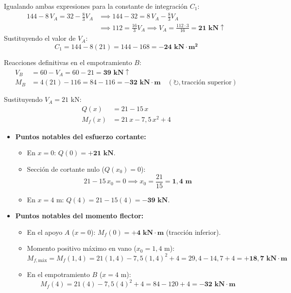 Igualando ambas expresiones para la constante de integración $C_1$:
\begin{align}
    144 - 8\,V_A = 32 - \frac{8}{3}V_A & \implies 144 - 32 = 8\,V_A - \frac{8}{3}V_A \nonumber \\
    & \implies 112 = \frac{16}{3}V_A \implies \boxed{V_A = \frac{112 \cdot 3}{16} = \mathbf{21\text{ kN}\uparrow}}
\end{align}
Sustituyendo el valor de $V_A$:
\begin{equation}
    C_1 = 144 - 8(21) = 144 - 168 = \mathbf{-24\text{ kN}\cdot\text{m}^2}
\end{equation}

Reacciones definitivas en el empotramiento $B$:
\begin{align}
    V_B & = 60 - V_A = 60 - 21 = \mathbf{39\text{ kN}\uparrow} \\[6pt]
    M_B & = 4(21) - 116 = 84 - 116 = \mathbf{-32\text{ kN}\cdot\text{m}} \quad (\circlearrowright, \text{tracción superior})
\end{align}


Sustituyendo $V_A = 21\text{ kN}$:
\begin{align}
    Q(x)   & = 21 - 15\,x \\[6pt]
    M_f(x) & = 21\,x - 7{,}5\,x^2 + 4
\end{align}

\begin{itemize}
    \item \textbf{Puntos notables del esfuerzo cortante:}
          \begin{itemize}
              \item En $x = 0$: $Q(0) = \mathbf{+21\text{ kN}}$.
              \item Sección de cortante nulo ($Q(x_0) = 0$):
                    \[
                        21 - 15\,x_0 = 0 \implies x_0 = \frac{21}{15} = \mathbf{1{,}4\text{ m}}
                    \]
              \item En $x = 4\text{ m}$: $Q(4) = 21 - 15(4) = \mathbf{-39\text{ kN}}$.
          \end{itemize}
    \item \textbf{Puntos notables del momento flector:}
          \begin{itemize}
              \item En el apoyo $A$ ($x = 0$): $M_f(0) = \mathbf{+4\text{ kN}\cdot\text{m}}$ (tracción inferior).
              \item Momento positivo máximo en vano ($x_0 = 1{,}4\text{ m}$):
                    \[
                        M_{f,\text{máx}} = M_f(1{,}4) = 21(1{,}4) - 7{,}5(1{,}4)^2 + 4 = 29{,}4 - 14{,}7 + 4 = \mathbf{+18{,}7\text{ kN}\cdot\text{m}}
                    \]
              \item En el empotramiento $B$ ($x = 4\text{ m}$):
                    \[
                        M_f(4) = 21(4) - 7{,}5(4)^2 + 4 = 84 - 120 + 4 = \mathbf{-32\text{ kN}\cdot\text{m}}
                    \]
          \end{itemize}
\end{itemize}

